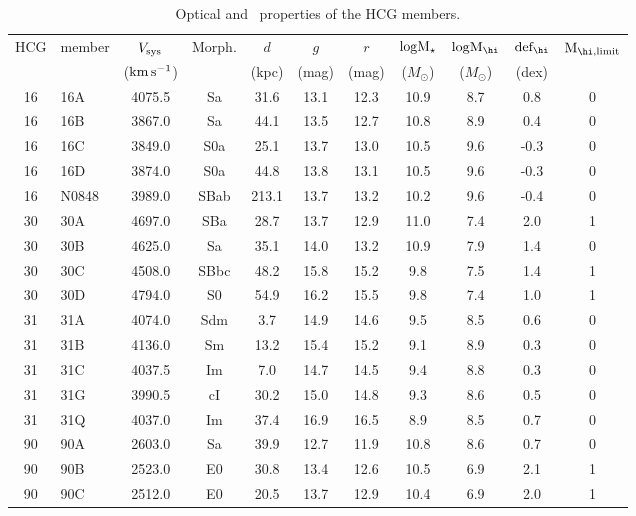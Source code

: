 \begin{table*}[]
        \begin{center}
        \caption{Optical and \hi\ properties of the HCG members.}
        \label{tab:hcg_mem_props}
        \begin{tabular}{clccccccccc}
        \hline \hline
\multirow{2}{*}{HCG} & \multirow{2}{*}{member} & $V_{\rm sys}$ & \multirow{2}{*}{Morph.} & $d$ & $g$ & $r$ & $\rm log{M_{\star}}$ & $\rm log{M_{\hi}}$ & $\rm def_{\hi}$ & \multirow{2}{*}{$\rm M_{\hi, limit}$} \\ 
  &  & ($\rm km\,s^{-1}$) &  & (kpc) & (mag) & (mag) & ($M_\odot$) & ($M_\odot$) & (dex) &  \\ 
 \hline\rule{0pt}{10pt} 
16 & 16A & 4075.5 & Sa & 31.6 & 13.1 & 12.3 & 10.9 & 8.7 & 0.8 & 0 \\ 
 16 & 16B & 3867.0 & Sa & 44.1 & 13.5 & 12.7 & 10.8 & 8.9 & 0.4 & 0 \\ 
 16 & 16C & 3849.0 & S0a & 25.1 & 13.7 & 13.0 & 10.5 & 9.6 & -0.3 & 0 \\ 
 16 & 16D & 3874.0 & S0a & 44.8 & 13.8 & 13.1 & 10.5 & 9.6 & -0.3 & 0 \\ 
 16 & N0848 & 3989.0 & SBab & 213.1 & 13.7 & 13.2 & 10.2 & 9.6 & -0.4 & 0 \\ 
 30 & 30A & 4697.0 & SBa & 28.7 & 13.7 & 12.9 & 11.0 & 7.4 & 2.0 & 1 \\ 
 30 & 30B & 4625.0 & Sa & 35.1 & 14.0 & 13.2 & 10.9 & 7.9 & 1.4 & 0 \\ 
 30 & 30C & 4508.0 & SBbc & 48.2 & 15.8 & 15.2 & 9.8 & 7.5 & 1.4 & 1 \\ 
 30 & 30D & 4794.0 & S0 & 54.9 & 16.2 & 15.5 & 9.8 & 7.4 & 1.0 & 1 \\ 
 31 & 31A & 4074.0 & Sdm & 3.7 & 14.9 & 14.6 & 9.5 & 8.5 & 0.6 & 0 \\ 
 31 & 31B & 4136.0 & Sm & 13.2 & 15.4 & 15.2 & 9.1 & 8.9 & 0.3 & 0 \\ 
 31 & 31C & 4037.5 & Im & 7.0 & 14.7 & 14.5 & 9.4 & 8.8 & 0.3 & 0 \\ 
 31 & 31G & 3990.5 & cI & 30.2 & 15.0 & 14.8 & 9.3 & 8.6 & 0.5 & 0 \\ 
 31 & 31Q & 4037.0 & Im & 37.4 & 16.9 & 16.5 & 8.9 & 8.5 & 0.7 & 0 \\ 
 90 & 90A & 2603.0 & Sa & 39.9 & 12.7 & 11.9 & 10.8 & 8.6 & 0.7 & 0 \\ 
 90 & 90B & 2523.0 & E0 & 30.8 & 13.4 & 12.6 & 10.5 & 6.9 & 2.1 & 1 \\ 
 90 & 90C & 2512.0 & E0 & 20.5 & 13.7 & 12.9 & 10.4 & 6.9 & 2.0 & 1 \\ 

\end{tabular}
\end{center}
\end{table*}

